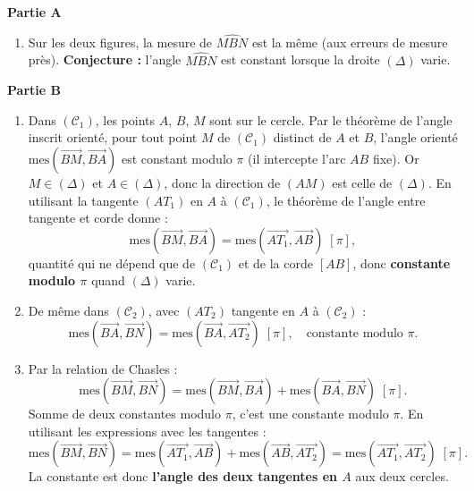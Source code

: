 \documentclass[11pt]{article}
\begin{document}
\begin{corrige}
\textbf{Partie A}
\begin{enumerate}
\item Sur les deux figures, la mesure de $\widehat{MBN}$ est la même (aux erreurs de mesure près). \textbf{Conjecture :} l'angle $\widehat{MBN}$ est constant lorsque la droite $(\Delta)$ varie.
\end{enumerate}

\textbf{Partie B}
\begin{enumerate}
\item Dans $(\mathcal{C}_1)$, les points $A$, $B$, $M$ sont sur le cercle. Par le théorème de l'angle inscrit orienté, pour tout point $M$ de $(\mathcal{C}_1)$ distinct de $A$ et $B$, l'angle orienté $\mathrm{mes}(\overrightarrow{BM}, \overrightarrow{BA})$ est constant modulo $\pi$ (il intercepte l'arc $AB$ fixe). Or $M \in (\Delta)$ et $A \in (\Delta)$, donc la direction de $(AM)$ est celle de $(\Delta)$. En utilisant la tangente $(AT_1)$ en $A$ à $(\mathcal{C}_1)$, le théorème de l'angle entre tangente et corde donne :
\[ \mathrm{mes}(\overrightarrow{BM}, \overrightarrow{BA}) = \mathrm{mes}(\overrightarrow{AT_1}, \overrightarrow{AB}) \; [\pi], \]
quantité qui ne dépend que de $(\mathcal{C}_1)$ et de la corde $[AB]$, donc \textbf{constante modulo $\pi$} quand $(\Delta)$ varie.
\item De même dans $(\mathcal{C}_2)$, avec $(AT_2)$ tangente en $A$ à $(\mathcal{C}_2)$ :
\[ \mathrm{mes}(\overrightarrow{BA}, \overrightarrow{BN}) = \mathrm{mes}(\overrightarrow{BA}, \overrightarrow{AT_2}) \; [\pi], \quad \text{constante modulo } \pi. \]
\item Par la relation de Chasles :
\[ \mathrm{mes}(\overrightarrow{BM}, \overrightarrow{BN}) = \mathrm{mes}(\overrightarrow{BM}, \overrightarrow{BA}) + \mathrm{mes}(\overrightarrow{BA}, \overrightarrow{BN}) \; [\pi]. \]
Somme de deux constantes modulo $\pi$, c'est une constante modulo $\pi$. En utilisant les expressions avec les tangentes :
\[ \mathrm{mes}(\overrightarrow{BM}, \overrightarrow{BN}) = \mathrm{mes}(\overrightarrow{AT_1}, \overrightarrow{AB}) + \mathrm{mes}(\overrightarrow{AB}, \overrightarrow{AT_2}) = \mathrm{mes}(\overrightarrow{AT_1}, \overrightarrow{AT_2}) \; [\pi]. \]
La constante est donc \textbf{l'angle des deux tangentes en $A$} aux deux cercles.
\end{enumerate}


\end{corrige}
\end{document}
